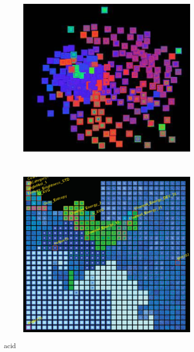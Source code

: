 \begin{figure}[h!]
    \centering
    \begin{subfigure}[b]{0.5\textwidth}
        \centering
        \includegraphics[width=\textwidth]{images/var1.png}
        \caption{}
        \label{fig:var1}
    \end{subfigure}%
    ~ %
    \begin{subfigure}[b]{0.475\textwidth}
        \centering
        \includegraphics[width=\textwidth]{images/var2.png}
        \caption{}
        \label{fig:var2}
    \end{subfigure}
    \caption[VaR: Value and Relation]{acid}
    \label{fig:met}
\end{figure}


